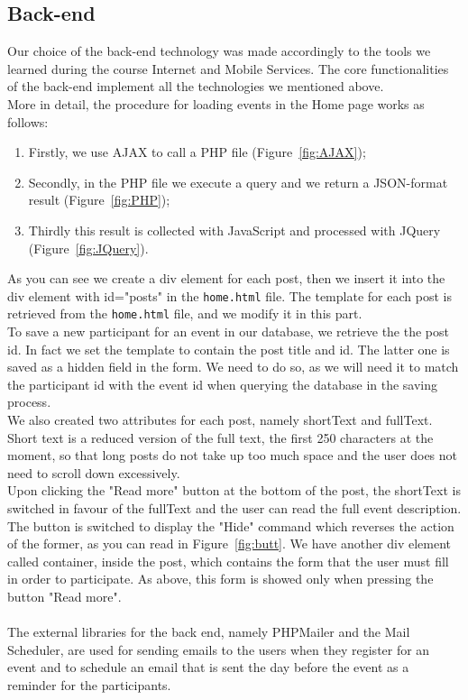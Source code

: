 \documentclass[a4paper]{article}
\begin{document}
	\subsection{Back-end}
	Our choice of the back-end technology was made accordingly to the tools we learned during the course Internet and Mobile Services. The core functionalities of the back-end implement all the technologies we mentioned above.\\
	More in detail, the procedure for loading events in the Home page works as follows:
	\begin{enumerate}
		\item Firstly, we use AJAX to call a PHP file (Figure~\ref{fig:AJAX});
		\item Secondly, in the PHP file we execute a query and we return a JSON-format result (Figure~\ref{fig:PHP});
		\item Thirdly this result is collected with JavaScript and processed with JQuery (Figure~\ref{fig:JQuery}).
	\end{enumerate} 
	As you can see we create a div element for each post, then we insert it into the div element with id="posts" in the \texttt{home.html} file. The template for each post is retrieved from the \texttt{home.html} file, and we modify it in this part.\\
	To save a new participant for an event in our database, we retrieve the the post id. In fact we set the template to contain the post title and id. The latter one is saved as a hidden field in the form. We need to do so, as we will need it to match the participant id with the event id when querying the database in the saving process.\\
	We also created two attributes for each post, namely shortText and fullText. Short text is a reduced version of the full text, the first 250 characters at the moment, so that long posts do not take up too much space and the user does not need to scroll down excessively.\\
	Upon clicking the "Read more" button at the bottom of the post, the shortText is switched in favour of the fullText and the user can read the full event description. The button is switched to display the "Hide" command which reverses the action of the former, as you can read in Figure~\ref{fig:butt}. We have another div element called container, inside the post, which contains the form that the user must fill in order to participate. As above, this form is showed only when pressing the button "Read more".\\\\
	The external libraries for the back end, namely PHPMailer and the Mail Scheduler, are used for sending emails to the users when they register for an event and to schedule an email that is sent the day before the event as a reminder for the participants.
	
\end{document}
